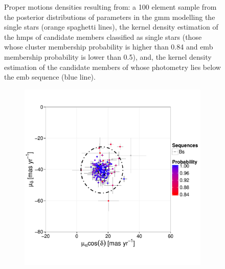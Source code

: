 \begin{figure}[ht!]
\begin{subfigure}[t]{0.45\textwidth}
        \caption{}
    \end{subfigure}
\caption{Proper motions densities resulting from: a 100 element sample from the posterior distributions of parameters in the \gls{gmm} modelling the single stars (orange spaghetti lines), the kernel density estimation of the \gls{hmps} of candidate members classified as single stars (those whose cluster membership probability is higher than 0.84 and \gls{emb} membership probability is lower than 0.5), and, the kernel density estimation of the candidate members of \citet{Bouy2015} whose photometry lies below the \gls{emb} sequence (blue line).}
\label{fig:PMCs}
\end{figure}

\begin{figure}[ht!]
    \centering
    \begin{subfigure}[t]{0.45\textwidth}
    \centering
       \includegraphics[page=2,width=\textwidth]{background/Figures/BHM/Bs_members.pdf}
        \caption{}
    \end{subfigure}
    \begin{subfigure}[t]{0.45\textwidth}
    \centering

\end{subfigure}
\end{figure}
